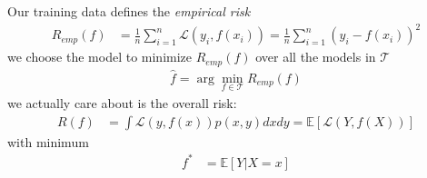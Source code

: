Our training data defines the \textit{empirical risk}
\begin{align*}
    R_{emp}(f) &=\frac{1}{n}\sum_{i=1}^{n}\mathcal{L}(y_i,f(x_i))=\frac{1}{n}\sum_{i=1}^{n}\left(y_i - f(x_i)\right)^2
\end{align*}
we choose the model to minimize $R_{emp}(f)$ over all the models in $\mathcal{T}$
\begin{align*}
    \hat{f} = \arg\min_{f\in\mathcal{T}} R_{emp}(f)
\end{align*}
 we actually care about is the overall risk:
\begin{align*}
    R(f)&=\int\mathcal{L}(y,f(x))p(x,y)dxdy = \mathbb{E}\left[\mathcal{L}(Y,f(X))\right]
\end{align*}
with minimum
\begin{align*}
    f^{*}&= \mathbb{E}\left[Y\vert X=x\right]
\end{align*}
